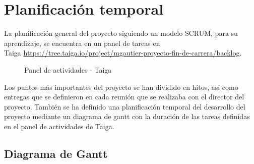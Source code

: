 \chapter{Planificación temporal}
\label{chap:planificacion}

La planificación general del proyecto siguiendo un modelo SCRUM, para su aprendizaje, se encuentra en un panel de tareas en \\Taiga \url{https://tree.taiga.io/project/mgautier-proyecto-fin-de-carrera/backlog}.

\begin{figure}[H]
\caption{Panel de actividades - Taiga}
\end{figure}

Los puntos más importantes del proyecto se han dividido en hitos, así como entregas que se definieron en cada reunión que se realizaba con el director del proyecto. También se ha definido una planificación temporal del desarrollo del proyecto mediante un diagrama de gantt con la duración de las tareas definidas en el panel de actividades de Taiga.\\

\section{Diagrama de Gantt}

